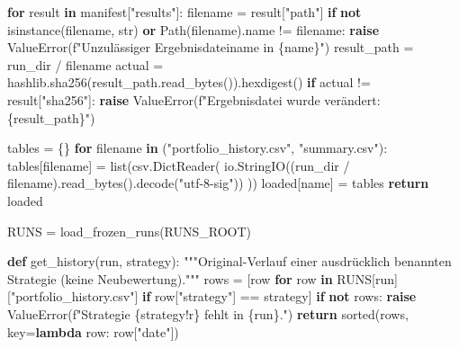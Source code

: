 \documentclass[
  ngerman,
  a4paper,
  DIV=11,
  oneside]{scrreprt}
\newenvironment{Shaded}{\begin{snugshade}}{\end{snugshade}}
\newcommand{\BuiltInTok}[1]{\textcolor[rgb]{0.00,0.23,0.31}{#1}}
\newcommand{\CommentTok}[1]{\textcolor[rgb]{0.37,0.37,0.37}{#1}}
\newcommand{\ControlFlowTok}[1]{\textcolor[rgb]{0.00,0.23,0.31}{\textbf{#1}}}
\newcommand{\KeywordTok}[1]{\textcolor[rgb]{0.00,0.23,0.31}{\textbf{#1}}}
\newcommand{\NormalTok}[1]{\textcolor[rgb]{0.00,0.23,0.31}{#1}}
\newcommand{\OperatorTok}[1]{\textcolor[rgb]{0.37,0.37,0.37}{#1}}
\newcommand{\PreprocessorTok}[1]{\textcolor[rgb]{0.68,0.00,0.00}{#1}}
\newcommand{\SpecialCharTok}[1]{\textcolor[rgb]{0.37,0.37,0.37}{#1}}
\newcommand{\SpecialStringTok}[1]{\textcolor[rgb]{0.13,0.47,0.30}{#1}}
\newcommand{\StringTok}[1]{\textcolor[rgb]{0.13,0.47,0.30}{#1}}
\begin{document}
\begin{Shaded}
\begin{Highlighting}[]
        \ControlFlowTok{for}\NormalTok{ result }\KeywordTok{in}\NormalTok{ manifest[}\StringTok{"results"}\NormalTok{]:}
\NormalTok{            filename }\OperatorTok{=}\NormalTok{ result[}\StringTok{"path"}\NormalTok{]}
            \ControlFlowTok{if} \KeywordTok{not} \BuiltInTok{isinstance}\NormalTok{(filename, }\BuiltInTok{str}\NormalTok{) }\KeywordTok{or}\NormalTok{ Path(filename).name }\OperatorTok{!=}\NormalTok{ filename:}
                \ControlFlowTok{raise} \PreprocessorTok{ValueError}\NormalTok{(}\SpecialStringTok{f"Unzulässiger Ergebnisdateiname in }\SpecialCharTok{\{}\NormalTok{name}\SpecialCharTok{\}}\SpecialStringTok{"}\NormalTok{)}
\NormalTok{            result\_path }\OperatorTok{=}\NormalTok{ run\_dir }\OperatorTok{/}\NormalTok{ filename}
\NormalTok{            actual }\OperatorTok{=}\NormalTok{ hashlib.sha256(result\_path.read\_bytes()).hexdigest()}
            \ControlFlowTok{if}\NormalTok{ actual }\OperatorTok{!=}\NormalTok{ result[}\StringTok{"sha256"}\NormalTok{]:}
                \ControlFlowTok{raise} \PreprocessorTok{ValueError}\NormalTok{(}\SpecialStringTok{f"Ergebnisdatei wurde verändert: }\SpecialCharTok{\{}\NormalTok{result\_path}\SpecialCharTok{\}}\SpecialStringTok{"}\NormalTok{)}

\NormalTok{        tables }\OperatorTok{=}\NormalTok{ \{\}}
        \ControlFlowTok{for}\NormalTok{ filename }\KeywordTok{in}\NormalTok{ (}\StringTok{"portfolio\_history.csv"}\NormalTok{, }\StringTok{"summary.csv"}\NormalTok{):}
\NormalTok{            tables[filename] }\OperatorTok{=} \BuiltInTok{list}\NormalTok{(csv.DictReader(}
\NormalTok{                io.StringIO((run\_dir }\OperatorTok{/}\NormalTok{ filename).read\_bytes().decode(}\StringTok{"utf{-}8{-}sig"}\NormalTok{))}
\NormalTok{            ))}
\NormalTok{        loaded[name] }\OperatorTok{=}\NormalTok{ tables}
    \ControlFlowTok{return}\NormalTok{ loaded}


\NormalTok{RUNS }\OperatorTok{=}\NormalTok{ load\_frozen\_runs(RUNS\_ROOT)}


\KeywordTok{def}\NormalTok{ get\_history(run, strategy):}
    \CommentTok{"""Original{-}Verlauf einer ausdrücklich benannten Strategie (keine Neubewertung)."""}
\NormalTok{    rows }\OperatorTok{=}\NormalTok{ [row }\ControlFlowTok{for}\NormalTok{ row }\KeywordTok{in}\NormalTok{ RUNS[run][}\StringTok{"portfolio\_history.csv"}\NormalTok{]}
            \ControlFlowTok{if}\NormalTok{ row[}\StringTok{"strategy"}\NormalTok{] }\OperatorTok{==}\NormalTok{ strategy]}
    \ControlFlowTok{if} \KeywordTok{not}\NormalTok{ rows:}
        \ControlFlowTok{raise} \PreprocessorTok{ValueError}\NormalTok{(}\SpecialStringTok{f"Strategie }\SpecialCharTok{\{}\NormalTok{strategy}\SpecialCharTok{!r\}}\SpecialStringTok{ fehlt in }\SpecialCharTok{\{}\NormalTok{run}\SpecialCharTok{\}}\SpecialStringTok{."}\NormalTok{)}
    \ControlFlowTok{return} \BuiltInTok{sorted}\NormalTok{(rows, key}\OperatorTok{=}\KeywordTok{lambda}\NormalTok{ row: row[}\StringTok{"date"}\NormalTok{])}



\end{Highlighting}
\end{Shaded}
\end{document}
